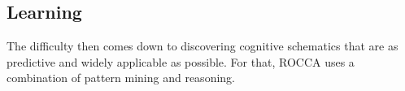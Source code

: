 \documentclass[runningheads]{llncs}
\newcommand{\lpreimp}[1]{\leadsto^{#1}}
\begin{document}

\subsection{Learning}
The difficulty then comes down to discovering cognitive schematics
that are as predictive and widely applicable as possible.  For that,
ROCCA uses a combination of pattern mining and reasoning.
\end{document}
